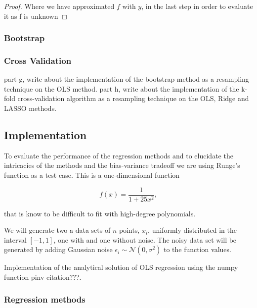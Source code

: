 \documentclass[amssymb,twocolumn,aps]{revtex4}
\begin{document}
\begin{proof}
Where we have approximated $f$ with $y$, in the last step in order to evaluate it as f is unknown
\end{proof}


\subsubsection{Bootstrap}


\subsubsection{Cross Validation}


part g, write about the implementation of the bootstrap method as a resampling technique on the OLS method.
part h, write about the implementation of the k-fold cross-validation algorithm as a resampling technique on the OLS, Ridge and LASSO methods.

\subsection{Implementation}
To evaluate the performance of the regression methods and to elucidate the intricacies of the methods and the bias-variance tradeoff we are using Runge's function as a test case.
This is a one-dimensional function

$$
f(x) = \frac{1}{1 + 25x^2},
$$

that is know to be difficult to fit with high-degree polynomials.

We will generate two a data sets of $n$ points, $x_i$, uniformly distributed in the interval $[-1, 1]$, one with and one without noise.
The noisy data set will be generated by adding Gaussian noise $\epsilon_i \sim \mathcal{N}(0, \sigma^2)$ to the function values.



Implementation of the analytical solution of OLS regression using the numpy function pinv {citation???}.
\subsubsection{Regression methods}
\end{document}
